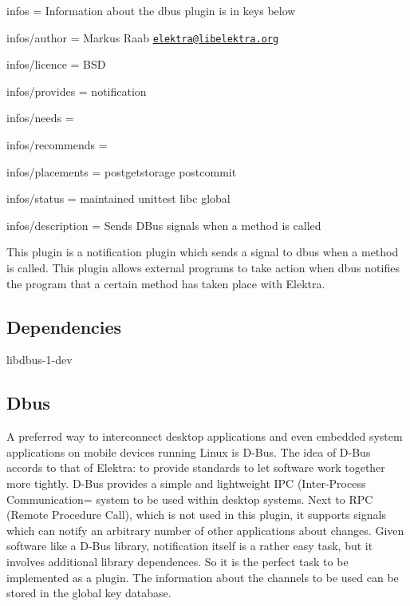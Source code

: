 
\begin{DoxyItemize}
\item infos = Information about the dbus plugin is in keys below
\item infos/author = Markus Raab \href{mailto:elektra@libelektra.org}{\tt elektra@libelektra.\+org}
\item infos/licence = B\+S\+D
\item infos/provides = notification
\item infos/needs =
\item infos/recommends =
\item infos/placements = postgetstorage postcommit
\item infos/status = maintained unittest libc global
\item infos/description = Sends D\+Bus signals when a method is called
\end{DoxyItemize}

This plugin is a notification plugin which sends a signal to dbus when a method is called. This plugin allows external programs to take action when dbus notifies the program that a certain method has taken place with Elektra.

\subsection*{Dependencies}


\begin{DoxyItemize}
\item {\ttfamily libdbus-\/1-\/dev}
\end{DoxyItemize}

\subsection*{Dbus}

A preferred way to interconnect desktop applications and even embedded system applications on mobile devices running Linux is D-\/\+Bus. The idea of D-\/\+Bus accords to that of Elektra\+: to provide standards to let software work together more tightly. D-\/\+Bus provides a simple and lightweight I\+P\+C (Inter-\/\+Process Communication= system to be used within desktop systems. Next to R\+P\+C (Remote Procedure Call), which is not used in this plugin, it supports signals which can notify an arbitrary number of other applications about changes. Given software like a D-\/\+Bus library, notification itself is a rather easy task, but it involves additional library dependences. So it is the perfect task to be implemented as a plugin. The information about the channels to be used can be stored in the global key database.

